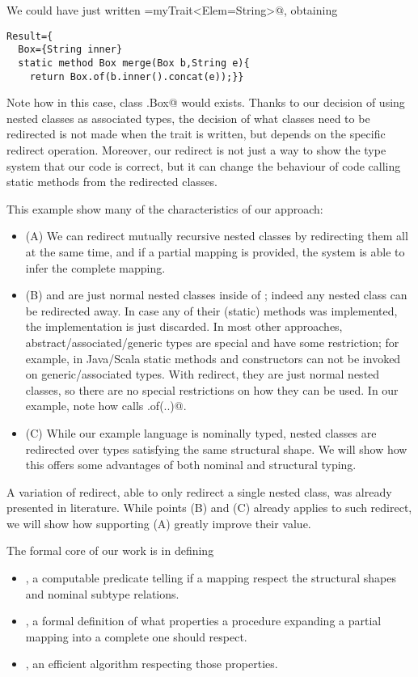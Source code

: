 We could have just written 
\Q@Result=myTrait<Elem=String>@, obtaining 
\begin{lstlisting}
Result={
  Box={String inner}
  static method Box merge(Box b,String e){
    return Box.of(b.inner().concat(e));}}
\end{lstlisting}
Note how in this case, class \Q@Result.Box@ would exists. Thanks to our decision of using nested classes
as associated types, the decision of what classes need to be redirected is not made when the trait is written,
but depends on the specific redirect operation.
Moreover, our redirect is not just a way to show the type system that our code is correct, but it can change 
the behaviour of code calling static methods from the redirected classes.


This example show many of the characteristics of our approach:
\begin{itemize}
\item(A) We can redirect mutually recursive nested classes by redirecting them all at the same time, and
if a partial mapping is provided, the system is able to infer the complete mapping.

\item(B) \Q@Box@ and \Q@Elem@ are just normal nested classes inside of \Q@myTrait@; indeed
any nested class can be redirected away.
In case any of their (static) methods was implemented, the implementation is just discarded.
In most other approaches, abstract/associated/generic types are special and have some restriction;
for example, in Java/Scala static methods and constructors can not be invoked on generic/associated types.
With redirect, they are just normal nested classes, so there are no special restrictions on how they can be used.
In our example, note how \Q@merge@ calls \Q@Box.of(..)@.

\item(C) 
While our example language is nominally typed, 
nested classes are redirected over types satisfying the same structural shape.
We will show how this offers some advantages of both nominal and structural typing.
\end{itemize}

A variation of redirect, able to only redirect a single nested class, was already presented in literature.
While points (B) and (C) already applies to such redirect,
we will show how supporting (A) greatly improve their value.

The formal core of our work is in defining 
\begin{itemize}
\item \Q@ValidRedirect@, a computable predicate telling if a mapping respect the structural shapes and
nominal subtype relations.
\item \Q@BestRedirect@, a formal definition of what properties a procedure 
expanding a partial mapping into a complete one should respect.
\item \Q@ChoseRedirect@, an efficient algorithm respecting those properties.
\end{itemize}

